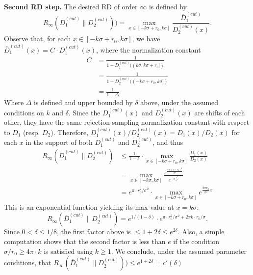 \textbf{Second RD step.} The desired RD of order $\infty$ is defined by
\[
  R_\infty(\overline{D}_1^{(cut)}\|D_2^{(cut)})) = \max_{x \in
    [-k\sigma+r_0,k\sigma]} \frac{\overline{D}_1^{(cut)}} {D_2^{(cut)}(x)}.
\]
Observe that, for each $x \in [-k\sigma+r_0,k\sigma]$, we have
$\overline{D}_1^{(cut)}(x) = C \cdot D_1^{(cut)}(x)$, where the normalization
constant
\begin{align*}
  C &= \frac{1}{1-D_1^{(cut)}((k\sigma,k\sigma+r_0])}\\
    &= \frac{1}{1-D_2^{(cut)}((-k\sigma+r_0,k\sigma])}\\
    &= \frac{1}{1-\Delta}
\end{align*}
Where $\Delta$ is defined and upper bounded by $\delta$ above, under the assumed
conditions on $k$ and $\delta$. Since the $D_1^{(cut)}(x)$ and $D_2^{(cut)}(x)$
are shifts of each other, they have the same rejection sampling normalization
constant with respect to $D_1$ (resp. $D_2$). Therefore,
$D_1^{(cut)}(x)/D_2^{(cut)}(x)=D_1(x)/D_2(x)$ for each $x$ in the support of
both $D_1^{(cut)}$ and $D_2^{(cut)}$, and thus
\begin{align*}
  R_\infty(\overline{D}_1^{(cut)}\|D_2^{(cut)}) &\leq \frac{1}{1-\delta} \cdot \max_{x \in [-k\sigma+r_0,k\sigma]} \frac{D_1(x)}
                                                  {D_2(x)}\\
                                                &= \max_{x \in [-k\sigma,k\sigma]}\frac{e^{\frac{-\pi(x-r_0)^2}{\sigma^2}}}{e^{-\pi\frac{x^2}{\sigma^2}}}
  \\
                                                &= e^{\pi \cdot r_0^2/\sigma^2} \cdot \max_{x \in [-k\sigma+r_0,k\sigma]}e^{\frac{2\pi r_0}
                                                  {\sigma^2}x}
\end{align*}
This is an exponential function yielding its max value at $x = k\sigma$:
$$
R_\infty(\overline{D}_1^{(cut)}\|D_2^{(cut)}) = e^{1/(1-\delta)} \cdot e^{\pi
  \cdot r_0^2/\sigma^2 + 2\pi k \cdot r_0/\sigma}.
$$
Since $0<\delta \leq 1/8$, the first factor above is
$\leq 1+2\delta \leq e^{2\delta}$. Also, a simple computation shows that the
second factor is less than $e$ if the condition $\sigma/r_0 \geq 4 \pi \cdot k$ is
satisfied using $k \geq 1$. We conclude, under the assumed parameter conditions,
that
$R_\infty(\overline{D}_1^{(cut)}\|D_2^{(cut)})) \leq e^{1+2\delta} = c'(\delta)$
